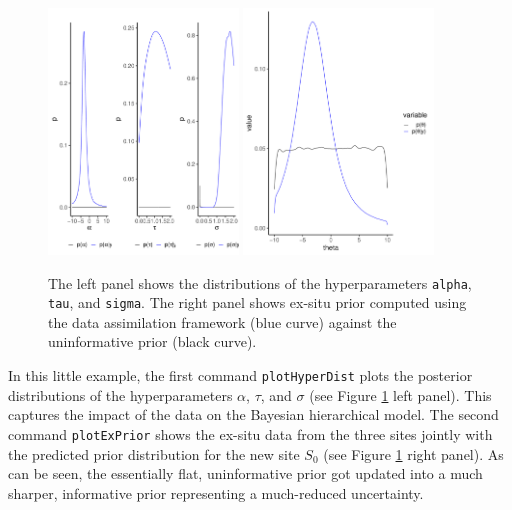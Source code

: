 \begin{figure}
    \centering
    \includegraphics[width=0.45\textwidth]{img/example_1_hyperDist.pdf}
    \includegraphics[width=0.45\textwidth]{img/example_1_exPrior.pdf}
    \caption{The left panel shows the distributions of the hyperparameters \texttt{alpha}, \texttt{tau}, and \texttt{sigma}. The right panel shows ex-situ prior computed using the data assimilation framework (blue curve) against the uninformative prior (black curve).}
    \label{fig:quick_example_prior}
\end{figure}

In this little example, the first command \texttt{plotHyperDist} plots the posterior distributions of the hyperparameters $\alpha$, $\tau$, and $\sigma$ (see Figure \ref{fig:quick_example_prior} left panel). 
This captures the impact of the data on the Bayesian hierarchical model. 
The second command \texttt{plotExPrior} shows the ex-situ data from the three sites jointly with the predicted prior distribution for the new site $S_0$ (see Figure \ref{fig:quick_example_prior} right panel). 
As can be seen, the essentially flat, uninformative prior got updated into a much sharper, informative prior representing a much-reduced uncertainty.

